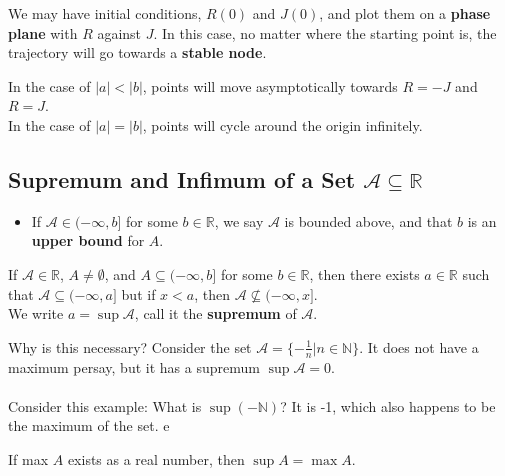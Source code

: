 \documentclass[12pt]{article}
\begin{document}
We may have initial conditions, $R(0)$ and $J(0)$, and plot them on a \textbf{phase plane} with $R$ against $J$. In this case, no matter where the starting point is, the trajectory will go towards a \textbf{stable node}.
\begin{figure}[h!]
\centering
{}
\end{figure}

In the case of $|a| < |b|$, points will move asymptotically towards $R = -J$ and $R = J$. \\
In the case of $|a| = |b|$, points will cycle around the origin infinitely.
\newpage

\subsection{Supremum and Infimum of a Set $\mathcal{A} \subseteq \mathbb{R}$}
\begin{itemize}
\item If $\mathcal{A} \in (-\infty, b]$ for some $b \in \mathbb{R}$, we say $\mathcal{A}$ is bounded above, and that $b$ is an \textbf{upper bound} for $A$. 
\end{itemize}

\begin{theorem}
If $\mathcal{A} \in \mathbb{R}$, $A \neq \emptyset$, and $A \subseteq (-\infty, b]$ for some $b \in \mathbb{R}$, then there exists $a \in \mathbb{R}$ such that $\mathcal{A} \subseteq (-\infty, a ]$ but if $x < a$, then $\mathcal{A} \not \subseteq (-\infty, x]$. \\
We write $a = \sup{\mathcal{A}}$, call it the \textbf{supremum} of $\mathcal{A}$.
\end{theorem}

Why is this necessary? Consider the set $\mathcal{A} = \{-\frac{1}{n} | n \in \mathbb{N} \}$. It does not have a maximum persay, but it has a supremum $\sup{\mathcal{A}} = 0$. \\ \\
Consider this example: What is $\sup{(-\mathbb{N})}$? It is -1, which also happens to be the maximum of the set.
e
\begin{theorem}
If max $A$ exists as a real number, then $\sup{A} = \max{A}$.
\end{theorem}
\end{document}
